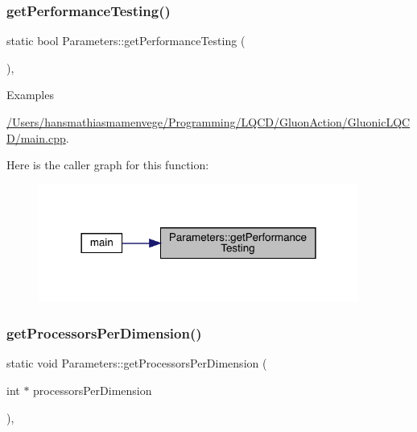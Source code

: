 \subsubsection{\texorpdfstring{getPerformanceTesting()}{getPerformanceTesting()}}
{\footnotesize\ttfamily static bool Parameters\+::get\+Performance\+Testing (\begin{DoxyParamCaption}{ }\end{DoxyParamCaption})\hspace{0.3cm}{\ttfamily [inline]}, {\ttfamily [static]}}

\begin{Desc}
\item[Examples]\par
\mbox{\hyperlink{_2_users_2hansmathiasmamenvege_2_programming_2_l_q_c_d_2_gluon_action_2_gluonic_l_q_c_d_2main_8cpp-example}{/\+Users/hansmathiasmamenvege/\+Programming/\+L\+Q\+C\+D/\+Gluon\+Action/\+Gluonic\+L\+Q\+C\+D/main.\+cpp}}.\end{Desc}
Here is the caller graph for this function\+:
\nopagebreak
\begin{figure}[H]
\begin{center}
\leavevmode
\includegraphics[width=298pt]{class_parameters_a778a2311c27854392c34c15bd4ea19f8_icgraph}
\end{center}
\end{figure}
\mbox{\label{class_parameters_a6b13faa642ebaf458203ae111a536d7a}} 
\subsubsection{\texorpdfstring{getProcessorsPerDimension()}{getProcessorsPerDimension()}}
{\footnotesize\ttfamily static void Parameters\+::get\+Processors\+Per\+Dimension (\begin{DoxyParamCaption}\item[{int $\ast$}]{processors\+Per\+Dimension }\end{DoxyParamCaption})\hspace{0.3cm}{\ttfamily [inline]}, {\ttfamily [static]}}

